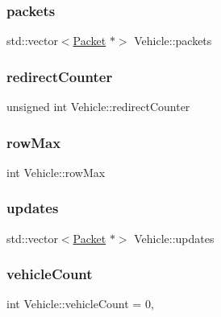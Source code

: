 \subsubsection{\texorpdfstring{packets}{packets}}
{\footnotesize\ttfamily std\+::vector$<$\hyperlink{struct_packet}{Packet} $\ast$$>$ Vehicle\+::packets}

\hypertarget{class_vehicle_afcbba425ca9dbca9c29e79e21f9f64fc}{}\label{class_vehicle_afcbba425ca9dbca9c29e79e21f9f64fc} 
\subsubsection{\texorpdfstring{redirect\+Counter}{redirectCounter}}
{\footnotesize\ttfamily unsigned int Vehicle\+::redirect\+Counter\hspace{0.3cm}{\ttfamily [protected]}}

\hypertarget{class_vehicle_a9c3dce0e6d67ba8f703cfd0ff10cb6ac}{}\label{class_vehicle_a9c3dce0e6d67ba8f703cfd0ff10cb6ac} 
\subsubsection{\texorpdfstring{row\+Max}{rowMax}}
{\footnotesize\ttfamily int Vehicle\+::row\+Max\hspace{0.3cm}{\ttfamily [protected]}}

\hypertarget{class_vehicle_a8b1176051f8d0fdc579e21bfe1660ece}{}\label{class_vehicle_a8b1176051f8d0fdc579e21bfe1660ece} 
\subsubsection{\texorpdfstring{updates}{updates}}
{\footnotesize\ttfamily std\+::vector$<$\hyperlink{struct_packet}{Packet} $\ast$$>$ Vehicle\+::updates}

\hypertarget{class_vehicle_ae139b67e1e1fcd510283f2a7aa358686}{}\label{class_vehicle_ae139b67e1e1fcd510283f2a7aa358686} 
\subsubsection{\texorpdfstring{vehicle\+Count}{vehicleCount}}
{\footnotesize\ttfamily int Vehicle\+::vehicle\+Count = 0\hspace{0.3cm}{\ttfamily [static]}, {\ttfamily [protected]}}

